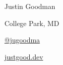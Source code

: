 \documentclass[11pt,letterpaper]{article}
\begin{document}
	\begin{center}
		{\LARGE Justin Goodman}
	\end{center}
	\begin{center}
		\begin{multicols}{3}
			\faMapMarker \hspace{0.25cm} College Park, MD
			
			\columnbreak
			
			\faGithub \hspace{0.25cm} \href{https://github.com/jugoodma}{@jugoodma}
			
			\columnbreak
			
			\faCode \hspace{0.25cm} \href{https://justgood.dev}{justgood.dev}
		\end{multicols}
	\end{center}
	
\end{document}
